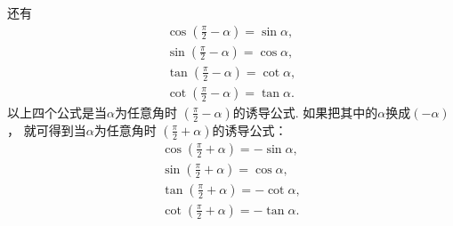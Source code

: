 还有\begin{gather}
	\cos\left(\frac{\pi}{2}-\alpha\right) = \sin\alpha,
		\label{equation:函数.三角函数.诱导公式9} \\
	\sin\left(\frac{\pi}{2}-\alpha\right) = \cos\alpha,
		\label{equation:函数.三角函数.诱导公式10} \\
	\tan\left(\frac{\pi}{2}-\alpha\right) = \cot\alpha,
		\label{equation:函数.三角函数.诱导公式11} \\
	\cot\left(\frac{\pi}{2}-\alpha\right) = \tan\alpha.
		\label{equation:函数.三角函数.诱导公式12}
\end{gather}
以上四个公式是当\(\alpha\)为任意角时
\(\left(\frac{\pi}{2}-\alpha\right)\)的诱导公式.
如果把其中的\(\alpha\)换成\((-\alpha)\)，
就可得到当\(\alpha\)为任意角时
\(\left(\frac{\pi}{2}+\alpha\right)\)的诱导公式：
\begin{gather}
	\cos\left(\frac{\pi}{2}+\alpha\right) = -\sin\alpha,
		\label{equation:函数.三角函数.诱导公式13} \\
	\sin\left(\frac{\pi}{2}+\alpha\right) = \cos\alpha,
		\label{equation:函数.三角函数.诱导公式14} \\
	\tan\left(\frac{\pi}{2}+\alpha\right) = -\cot\alpha,
		\label{equation:函数.三角函数.诱导公式15} \\
	\cot\left(\frac{\pi}{2}+\alpha\right) = -\tan\alpha.
		\label{equation:函数.三角函数.诱导公式16}
\end{gather}


